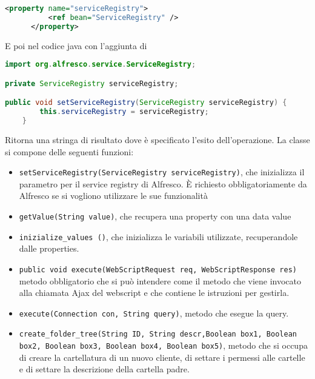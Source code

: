 \begin{lstlisting}[language=XML]
        <property name="serviceRegistry">
          <ref bean="ServiceRegistry" />
      </property>
\end{lstlisting}
E poi nel codice java con l’aggiunta di
\begin{lstlisting}[language=Java]
import org.alfresco.service.ServiceRegistry;

private ServiceRegistry serviceRegistry;

public void setServiceRegistry(ServiceRegistry serviceRegistry) {
		this.serviceRegistry = serviceRegistry;
	}
\end{lstlisting}
Ritorna una stringa di risultato dove è specificato l’esito dell’operazione.
La classe si compone delle seguenti funzioni:
\begin{itemize}
\item \texttt{setServiceRegistry(ServiceRegistry serviceRegistry)}, che inizializza il parametro per il service registry di Alfresco. È richiesto obbligatoriamente da Alfresco se si vogliono utilizzare le sue funzionalità
\item \texttt{getValue(String value)}, che recupera una property con una data value
\item \texttt{inizialize\_values ()}, che inizializza le variabili utilizzate, recuperandole dalle properties.
\item \texttt{public void execute(WebScriptRequest req, WebScriptResponse res)} metodo obbligatorio che si può intendere come il metodo che viene invocato alla chiamata Ajax del webscript e che contiene le istruzioni per gestirla.
\item \texttt{execute(Connection con, String query)}, metodo che esegue la query.
\item \texttt{create\_folder\_tree(String ID, String descr,Boolean box1, Boolean box2, Boolean box3, Boolean box4, Boolean box5)}, metodo che si occupa di creare la cartellatura di un nuovo cliente, di settare i permessi alle cartelle e di settare la descrizione della cartella padre.
\end{itemize}
